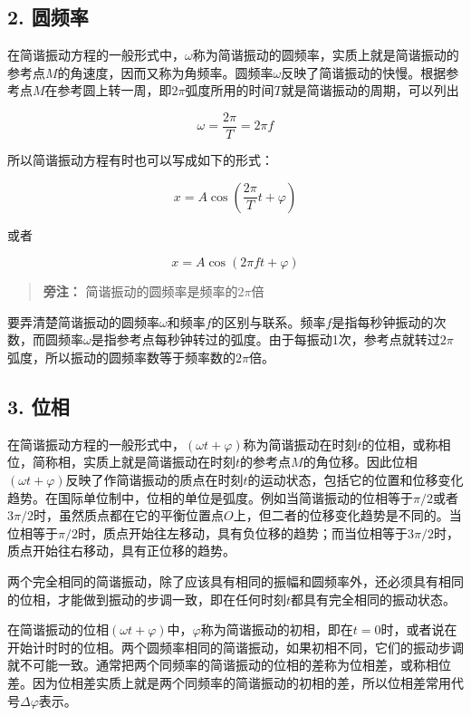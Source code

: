 \subsection{2. 圆频率}\label{ux5706ux9891ux7387}

在简谐振动方程的一般形式中，\(\omega\)称为简谐振动的圆频率，实质上就是简谐振动的参考点\(M\)的角速度，因而又称为角频率。圆频率\(\omega\)反映了简谐振动的快慢。根据参考点\(M\)在参考圆上转一周，即\(2\pi\)弧度所用的时间\(T\)就是简谐振动的周期，可以列出

\[
\omega = \frac{2\pi}{T} = 2\pi f \tag{1.7}
\]

所以简谐振动方程有时也可以写成如下的形式：

\[
x = A \cos \left(\frac {2 \pi}{T} t + \varphi\right) \tag {1.8}
\]

或者

\[
x = A\cos(2\pi f t+\varphi) \tag{1.9}
\]

\begin{quote}
\textbf{旁注：} 简谐振动的圆频率是频率的\(2\pi\)倍
\end{quote}

要弄清楚简谐振动的圆频率\(\omega\)和频率\(f\)的区别与联系。频率\(f\)是指每秒钟振动的次数，而圆频率\(\omega\)是指参考点每秒钟转过的弧度。由于每振动1次，参考点就转过\(2\pi\)弧度，所以振动的圆频率数等于频率数的\(2\pi\)倍。

\subsection{3. 位相}\label{ux4f4dux76f8}

在简谐振动方程的一般形式中，\((\omega t + \varphi)\)称为简谐振动在时刻\(t\)的位相，或称相位，简称相，实质上就是简谐振动在时刻\(t\)的参考点\(M\)的角位移。因此位相\((\omega t + \varphi)\)反映了作简谐振动的质点在时刻\(t\)的运动状态，包括它的位置和位移变化趋势。在国际单位制中，位相的单位是弧度。例如当简谐振动的位相等于\(\pi / 2\)或者\(3\pi / 2\)时，虽然质点都在它的平衡位置点\(O\)上，但二者的位移变化趋势是不同的。当位相等于\(\pi / 2\)时，质点开始往左移动，具有负位移的趋势；而当位相等于\(3\pi/2\)时，质点开始往右移动，具有正位移的趋势。

两个完全相同的简谐振动，除了应该具有相同的振幅和圆频率外，还必须具有相同的位相，才能做到振动的步调一致，即在任何时刻\(t\)都具有完全相同的振动状态。

在简谐振动的位相\((\omega t + \varphi)\)中，\(\varphi\)称为简谐振动的初相，即在\(t = 0\)时，或者说在开始计时时的位相。两个圆频率相同的简谐振动，如果初相不同，它们的振动步调就不可能一致。通常把两个同频率的简谐振动的位相的差称为位相差，或称相位差。因为位相差实质上就是两个同频率的简谐振动的初相的差，所以位相差常用代号\(\Delta \varphi\)表示。

